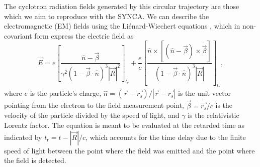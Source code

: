The cyclotron radiation fields generated by this circular trajectory are those which we aim to reproduce with the SYNCA. We can describe the electromagnetic (EM) fields using the Li\'{e}nard-Wiechert equations \cite{jackson_classical_1999, nb_thesis}, which in non-covariant form express the electric field as
\begin{equation}
    \label{eq:lw-e}
      \vec{E}  =e\left[\frac{\hat{n}-\vec{\beta}}{\gamma^2(1-\vec{\beta}\cdot\hat{n})^3|\vec{R}|^2}\right]_{t_\textrm{r}}
      +\frac{e}{c}\left[\frac{\hat{n}\times[(\hat{n}-\vec{\beta})\times\dot{\vec{\beta}}]}{(1-\vec{\beta}\cdot\hat{n})^3|\vec{R}|}\right]_{t_\textrm{r}},
\end{equation}
where $e$ is the particle's charge, $\hat n = (\vec{r}-\vec{r_s})/|\vec{r}-\vec{r_s}|$ is the unit vector pointing from the electron to the field measurement point, $\vec\beta=\dot{\vec{r_s}}/c$ is the velocity of the particle divided by the speed of light, and $\gamma$ is the relativistic Lorentz factor. The equation is meant to be evaluated at the retarded time as indicated by $t_\textrm{r}=t-|\vec{R}|/c$, which accounts for the time delay due to the finite speed of light between the point where the field was emitted and the point where the field is detected.

